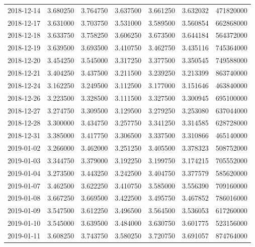 \begin{tabular}{lrrrrrr}
2018-12-14 &    3.680250 &    3.764750 &    3.637500 &    3.661250 &    3.632032 &   471820000 \\
2018-12-17 &    3.631000 &    3.703750 &    3.531000 &    3.589500 &    3.560854 &   662868000 \\
2018-12-18 &    3.633750 &    3.758250 &    3.606250 &    3.673500 &    3.644184 &   564372000 \\
2018-12-19 &    3.639500 &    3.693500 &    3.410750 &    3.462750 &    3.435116 &   745364000 \\
2018-12-20 &    3.454250 &    3.545000 &    3.317250 &    3.377500 &    3.350545 &   749588000 \\
2018-12-21 &    3.404250 &    3.437500 &    3.211500 &    3.239250 &    3.213399 &   863740000 \\
2018-12-24 &    3.162250 &    3.249500 &    3.112500 &    3.177000 &    3.151646 &   463840000 \\
2018-12-26 &    3.223500 &    3.328500 &    3.111500 &    3.327500 &    3.300945 &   695100000 \\
2018-12-27 &    3.274750 &    3.309500 &    3.129500 &    3.279250 &    3.253080 &   637044000 \\
2018-12-28 &    3.300000 &    3.434750 &    3.257750 &    3.341250 &    3.314585 &   628728000 \\
2018-12-31 &    3.385000 &    3.417750 &    3.306500 &    3.337500 &    3.310866 &   465140000 \\
2019-01-02 &    3.266000 &    3.462000 &    3.251250 &    3.405500 &    3.378323 &   508752000 \\
2019-01-03 &    3.344750 &    3.379000 &    3.192250 &    3.199750 &    3.174215 &   705552000 \\
2019-01-04 &    3.273500 &    3.443250 &    3.242500 &    3.404750 &    3.377579 &   585620000 \\
2019-01-07 &    3.462500 &    3.622250 &    3.410750 &    3.585000 &    3.556390 &   709160000 \\
2019-01-08 &    3.667250 &    3.669500 &    3.422500 &    3.495750 &    3.467852 &   786016000 \\
2019-01-09 &    3.547500 &    3.612250 &    3.496500 &    3.564500 &    3.536053 &   617260000 \\
2019-01-10 &    3.545000 &    3.639500 &    3.484000 &    3.630750 &    3.601775 &   523156000 \\
2019-01-11 &    3.608250 &    3.743750 &    3.580250 &    3.720750 &    3.691057 &   874764000 \\

\end{tabular}

